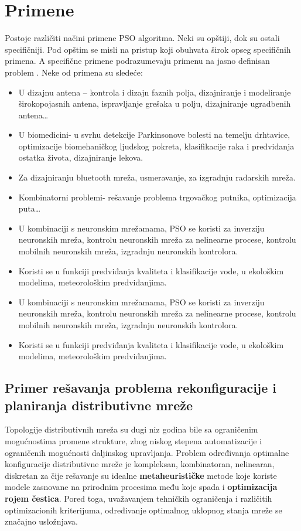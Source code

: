 \documentclass[a4paper]{article}
\begin{document}
\section{Primene}
Postoje različiti načini primene PSO algoritma. Neki su opštiji, dok su ostali specifičniji. Pod opštim se misli na pristup koji obuhvata širok opseg specifičnih primena. A specifične primene podrazumevaju primenu na jasno definisan problem \cite{eberhart2001swarm}.
Neke od primena su sledeće:
\begin{itemize}
    \item U dizajnu antena – kontrola i dizajn faznih polja, dizajniranje i modeliranje širokopojasnih antena, ispravljanje grešaka u polju, dizajniranje ugradbenih antena…
    \item U biomedicini- u svrhu detekcije Parkinsonove bolesti na temelju drhtavice, optimizacije biomehaničkog ljudskog pokreta, klasifikacije raka i predviđanja ostatka života, dizajniranje lekova.
    \item Za dizajniranju bluetooth mreža, usmeravanje, za izgradnju radarskih mreža.
    \item Kombinatorni problemi- rešavanje problema trgovačkog putnika, optimizacija puta…
    \item U kombinaciji s neuronskim mrežamama, PSO se koristi za inverziju neuronskih mreža, kontrolu neuronskih mreža za nelinearne procese,  kontrolu mobilnih neuronskih mreža, izgradnju neuronskih kontrolora.
    \item Koristi se u funkciji predviđanja kvaliteta i klasifikacije vode, u ekološkim modelima, meteorološkim predviđanjima.
    \item U kombinaciji s neuronskim mrežamama, PSO se koristi za inverziju neuronskih mreža, kontrolu neuronskih mreža za nelinearne procese,  kontrolu mobilnih neuronskih mreža, izgradnju neuronskih kontrolora.
    \item Koristi se u funkciji predviđanja kvaliteta i klasifikacije vode, u ekološkim modelima, meteorološkim predviđanjima.
     
   
\end{itemize}

\subsection{Primer rešavanja problema rekonfiguracije i planiranja distributivne mreže}
\vspace{5mm} 


Topologije distributivnih mreža su dugi niz godina bile sa ograničenim mogućnostima promene strukture, zbog niskog stepena automatizacije i ograničenih mogućnosti daljinskog upravljanja. 
Problem određivanja optimalne konfiguracije distributivne mreže je kompleksan, kombinatoran, nelinearan, diskretan za čije rešavanje su idealne \textbf{metaheurističke} metode koje koriste modele zasnovane na prirodnim procesima među koje spada i \textbf{optimizacija rojem čestica}. Pored toga, uvažavanjem tehničkih ograničenja i različitih optimizacionih kriterijuma, određivanje optimalnog uklopnog stanja mreže se značajno usložnjava.
\end{document}
